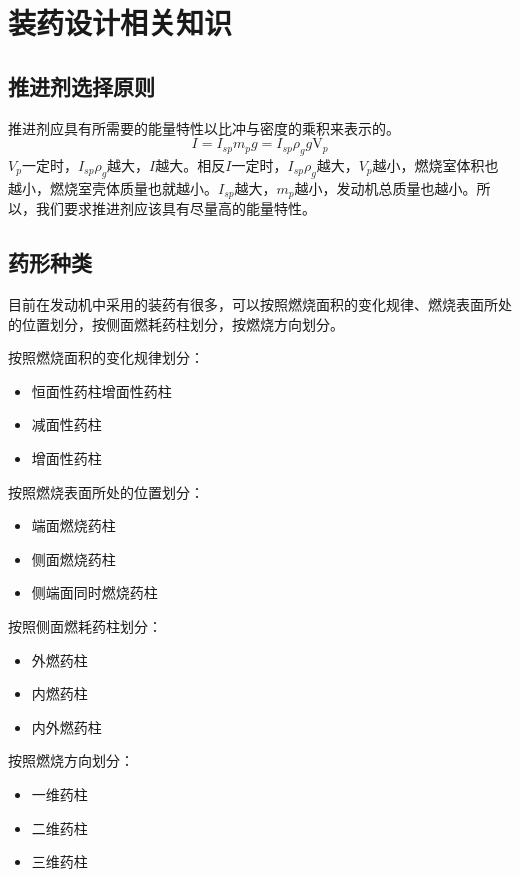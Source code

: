 
\chapter{装药设计相关知识}

\section{推进剂选择原则}

推进剂应具有所需要的能量特性以比冲与密度的乘积来表示的。
\[
    I=I_{sp}m_pg=I_{sp}\rho _gg\mathrm{V}_p
\]
$V_{p}$一定时，$I_{sp}\rho _g$越大，$I$越大。相反$I$一定时，$I_{sp}\rho _g$越大，$V_{p}$越小，燃烧室体积也越小，燃烧室壳体质量也就越小。$I_{sp}$越大，$m_{p}$越小，发动机总质量也越小。所以，我们要求推进剂应该具有尽量高的能量特性。

\section{药形种类}

目前在发动机中采用的装药有很多，可以按照燃烧面积的变化规律、燃烧表面所处的位置划分，按侧面燃耗药柱划分，按燃烧方向划分。

按照燃烧面积的变化规律划分：
\begin{itemize}[leftmargin=2em]
    \item 恒面性药柱增面性药柱
    \item 减面性药柱
    \item 增面性药柱
\end{itemize}

按照燃烧表面所处的位置划分：
\begin{itemize}[leftmargin=2em]
    \item 端面燃烧药柱
    \item 侧面燃烧药柱
    \item 侧端面同时燃烧药柱
\end{itemize}

按照侧面燃耗药柱划分：
\begin{itemize}[leftmargin=2em]
    \item 外燃药柱
    \item 内燃药柱
    \item 内外燃药柱
\end{itemize}

按照燃烧方向划分：
\begin{itemize}[leftmargin=2em]
    \item 一维药柱
    \item 二维药柱
    \item 三维药柱
\end{itemize}

